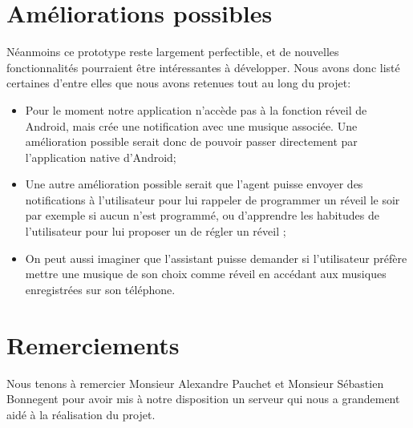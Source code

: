 {\section*{Améliorations possibles}
Néanmoins ce prototype reste largement perfectible, et de nouvelles fonctionnalités pourraient être intéressantes à développer. Nous avons donc listé certaines d'entre elles que nous avons retenues tout au long du projet:
\begin{itemize}
	\item Pour le moment notre application n'accède pas à la fonction réveil de Android, mais crée une notification avec une musique associée. Une amélioration possible serait donc de pouvoir passer directement par l'application native d'Android;
	\item Une autre amélioration possible serait que l'agent puisse envoyer des notifications à l'utilisateur pour lui rappeler de programmer un réveil le soir par exemple si aucun n'est programmé, ou d'apprendre les habitudes de l'utilisateur pour lui proposer un de régler un réveil ;
	\item On peut aussi imaginer que l'assistant puisse demander si l'utilisateur préfère mettre une musique de son choix comme réveil en accédant aux musiques enregistrées sur son téléphone.
\end{itemize}
}

\section*{Remerciements}

Nous tenons à remercier Monsieur Alexandre Pauchet et Monsieur Sébastien Bonnegent pour avoir mis à notre disposition un serveur qui nous a grandement aidé à la réalisation
du projet.
